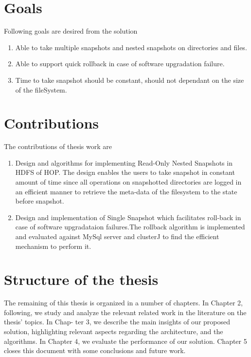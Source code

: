\section{Goals}
Following goals are desired from the solution
\begin{enumerate}
\item Able to take multiple snapshots and nested snapshots on directories and files.
\item Able to support quick rollback in case of software upgradation failure.
\item Time to take snapshot should be constant, should not dependant on the size of the fileSystem.
\end{enumerate}

\section{Contributions}
The contributions of thesis work are 
\begin{enumerate}
\item Design and algorithms for implementing Read-Only Nested Snapshots in HDFS of HOP. The design enables the users to take snapshot in constant amount of time since all operations on snapshotted directories are logged in an efficient manner to retrieve the meta-data of the filesystem to the state before snapshot.
\item Design and implementation of Single Snapshot which facilitates roll-back in case of software upgradataion failures.The rollback algorithm is implemented and evaluated against MySql server and clusterJ to find the efficient mechanism to perform it.

\end{enumerate}

\section{Structure of the thesis}
The remaining of this thesis is organized in a number of chapters. In Chapter 2, following, we
study and analyze the relevant related work in the literature on the thesis’ topics. In Chap-
ter 3, we describe the main insights of our proposed solution, highlighting relevant aspects
regarding the architecture, and the algorithms. In Chapter 4, we evaluate the performance of our solution. Chapter 5 closes this document with some conclusions and future work. 







